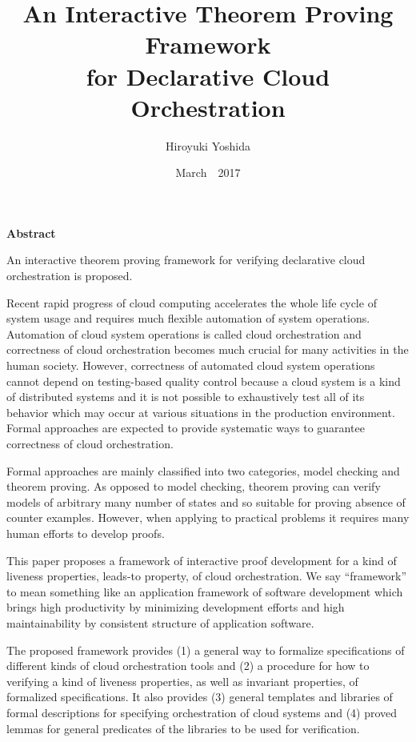 \documentclass[12pt]{report}
\title{An Interactive Theorem Proving Framework\\for Declarative Cloud Orchestration}
\author{Hiroyuki Yoshida}
\date{March\ \ 2017}
\begin{document}
\maketitle
{}  %
\setcounter{page}{1}
\strut
\vspace{20pt}
\begin{center}
{\LARGE\bf Abstract}
\end{center}
\vspace{20pt}
An interactive theorem proving framework for verifying declarative
cloud orchestration is proposed.

Recent rapid progress of cloud computing accelerates the whole life
cycle of system usage and requires much flexible automation of system
operations. Automation of cloud system operations is called cloud
orchestration and correctness of cloud orchestration becomes much
crucial for many activities in the human society.  However,
correctness of automated cloud system operations cannot depend on
testing-based quality control because a cloud system is a kind of
distributed systems and it is not possible to exhaustively test all of
its behavior which may occur at various situations in the production
environment. Formal approaches are expected to provide systematic
ways to guarantee correctness of cloud orchestration.

Formal approaches are mainly classified into two categories, model
checking and theorem proving. As opposed to model checking, theorem
proving can verify models of arbitrary many number of states and so
suitable for proving absence of counter examples. However, when
applying to practical problems it requires many human efforts to
develop proofs.

This paper proposes a framework of interactive proof development for a
kind of liveness properties, leads-to property, of cloud
orchestration. We say ``framework'' to mean something like an
application framework of software development which brings high
productivity by minimizing development efforts and high
maintainability by consistent structure of application software.

The proposed framework provides (1) a general way to formalize
specifications of different kinds of cloud orchestration tools and (2)
a procedure for how to verifying a kind of liveness properties, as
well as invariant properties, of formalized specifications.  It also
provides (3) general templates and libraries of formal descriptions
for specifying orchestration of cloud systems and (4) proved lemmas
for general predicates of the libraries to be used for verification.
\end{document}
